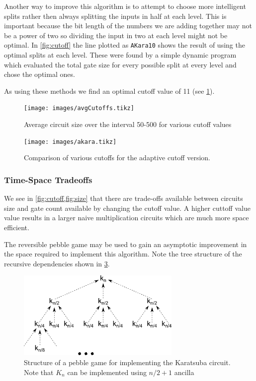       Another way to improve this algorithm is to attempt to choose more intelligent splits rather then always splitting the inputs in half at each level.
      This is important because the bit length of the numbers we are adding together may not be a power of two so dividing the input in two at each level might not be optimal.
      In \cref{fig:cutoff} the line plotted as \verb+AKara10+ shows the result of using the optimal splits at each level.
      These were found by a simple dynamic program which evaluated the total gate size for every possible split at every level and chose the optimal ones.

      As using these methods we find an optimal cutoff value of 11 (see \cref{fig:cutoffs}).
      \begin{figure}[p]
        \capstart
        \texttt{[image: images/avgCutoffs.tikz]}
        \caption{Average circuit size over the interval 50-500 for various cutoff values}
        \label{fig:cutoffs}
      \end{figure}
      \begin{figure}[p]
        \capstart
        \texttt{[image: images/akara.tikz]}
        \caption{Comparison of various cutoffs for the adaptive cutoff version.}
        \label{fig:aKara}
     \end{figure}

   \subsubsection{Time-Space Tradeoffs}

     We see in \cref{fig:cutoff,fig:size} that there are trade-offs available
     between circuits size and gate count available by changing the cutoff
     value.  A higher cuttoff value value results in a larger naive
     multiplication circuits which are much more space efficient.

     The reversible pebble game may be used to gain an asymptotic improvement
     in the space required to implement this algorithm. Note the tree structure
     of the recursive dependencies shown in \cref{fig:kara-mdd}. 

      \begin{figure}[p]
        \capstart
        \centering
        \includegraphics[width=0.7\textwidth]{images/kara-mdd}
        \caption{Structure of a pebble game for implementing the Karatsuba circuit. Note that $K_n$ can be implemented using $n/2+1$ ancilla}
        \label{fig:kara-mdd}
      \end{figure}

